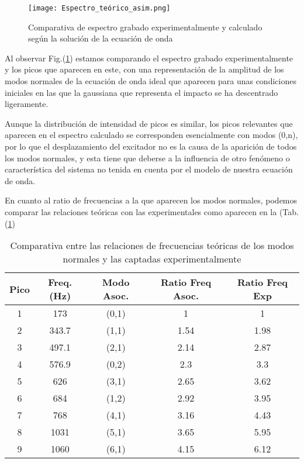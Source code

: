 \documentclass[journal, a4paper,onecolumn]{IEEEtran}
\newcommand{\figref}[1]{Fig.(\ref{#1})}
\newcommand{\tabref}[1]{(Tab.(\ref{#1})}
\begin{document}
\begin{figure}[H]
    \centering
    \texttt{[image: Espectro\_teórico\_asim.png]} 
   \caption{Comparativa de espectro grabado experimentalmente y calculado según la solución de la ecuación de onda }
   \label{Espectro_teorico_comparativa}
    \end{figure}
    
Al observar \figref{Espectro_teorico_comparativa} estamos comparando el espectro grabado experimentalmente y los picos que aparecen en este, con una representación de la amplitud de los modos normales de la ecuación de onda ideal que aparecen para unas condiciones iniciales en las que la gaussiana que representa el impacto se ha descentrado ligeramente.\newline

Aunque la distribución de intensidad de picos es similar, los picos relevantes que aparecen en el espectro calculado se corresponden esencialmente con modos (0,n), por lo que el desplazamiento del excitador no es la causa de la aparición de todos los modos normales, y esta tiene que deberse a la influencia de otro fenómeno o característica del sistema no tenida en cuenta por el modelo de nuestra ecuación de onda. \newline


En cuanto al ratio de frecuencias a la que aparecen los modos normales, podemos comparar las relaciones teóricas con las experimentales como aparecen en la \tabref{relacionfreqmodoscentro}

\begin{table}[H]
\centering
\begin{tabular}{c|c|c|c|c}
Pico & Freq.(Hz) & Modo Asoc. & Ratio Freq Asoc. & Ratio Freq Exp \\ \hline
1    & 173       & (0,1)      & 1                & 1              \\ \hline
2    & 343.7     & (1,1)      & 1.54             & 1.98           \\ \hline
3    & 497.1     & (2,1)      & 2.14             & 2.87           \\ \hline
4    & 576.9     & (0,2)      & 2.3              & 3.3            \\ \hline
5    & 626       & (3,1)      & 2.65             & 3.62           \\ \hline
6    & 684       & (1,2)      & 2.92             & 3.95           \\ \hline
7    & 768       & (4,1)      & 3.16             & 4.43           \\ \hline
8    & 1031      & (5,1)      & 3.65             & 5.95           \\ \hline
9    & 1060      & (6,1)      & 4.15             & 6.12          
\end{tabular}
\caption{Comparativa entre las relaciones de frecuencias teóricas de los modos normales y las captadas experimentalmente}
\label{relacionfreqmodoscentro}
\end{table}
\end{document}
